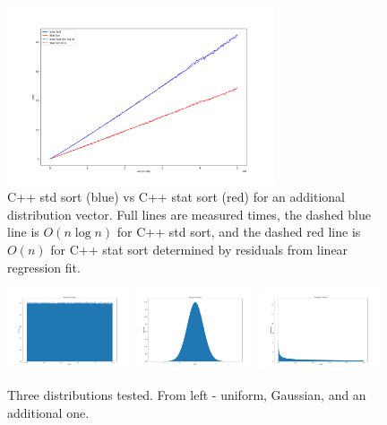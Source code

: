 \documentclass[12pt]{article}
\begin{document}
		\begin{figure}
		\begin{center}
			\includegraphics[width=0.7\textwidth]{fig_perf_weird}
		\end{center}
			\caption{C++ std sort (blue) vs C++ stat sort (red) for an additional distribution vector. Full lines are measured times, the dashed blue line is $O(n \log n)$ for C++ std sort, and the dashed red line is $O(n)$ for C++ stat sort determined by residuals from linear regression fit.}
		
		\label{fig3}
		\end{figure}		
		
		\begin{figure}
		\begin{center}
			\includegraphics[width=0.32\textwidth]{fig_dist_norm}
			\includegraphics[width=0.32\textwidth]{fig_dist_gauss}
			\includegraphics[width=0.32\textwidth]{fig_dist_weird}
		\end{center}
		\caption{Three distributions tested. From left - uniform, Gaussian, and an additional one.}
		\label{fig4}
		\end{figure}		
						
\end{document}
